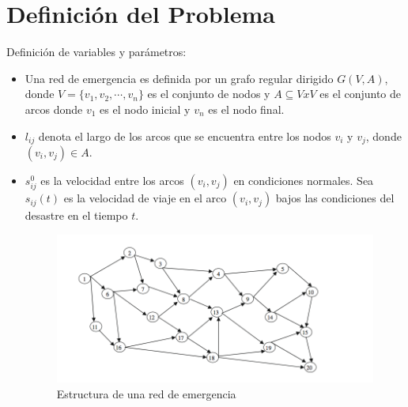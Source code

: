 \documentclass[letter, 10pt]{article}
\begin{document}
\section{Definici\'on del Problema}

Definición de variables y parámetros:
\begin{itemize}
	\item Una red de emergencia es definida por un grafo regular dirigido $G(V,A)$, donde $V=\{v_1,v_2,\cdots, v_n\}$ es el conjunto de nodos y $A\subseteq V x V$ es el conjunto de arcos donde $v_1$ es el nodo inicial y $v_n$ es el nodo final.
	\item $l_{ij}$ denota el largo de los arcos que se encuentra entre los nodos $v_i$ y $v_j$, donde $(v_i,v_j) \in A$.
	\item $s_{ij}^0$ es la velocidad entre los arcos $(v_i,v_j)$ en condiciones normales. Sea $s_{ij}(t)$ es la velocidad de viaje en el arco $(v_i,v_j)$ bajos las condiciones del desastre en el tiempo $t$.\\

\begin{figure}[h]
\centering
\includegraphics[scale=0.5]{images/routes.png}
\caption{Estructura de una red de emergencia}
\end{figure}
	

\end{itemize}
\end{document}
